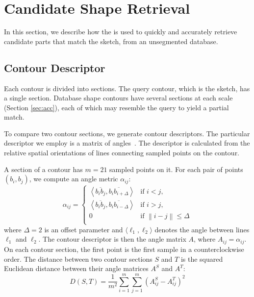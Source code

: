 
\section{Candidate Shape Retrieval}\label{sec:candshape}
In this section, we describe how the {\RCKNNG} is used to quickly and accurately retrieve candidate parts that match the sketch, from an unsegmented database.

\subsection{Contour Descriptor}\label{subsec:CtourDesc}
Each contour is divided into sections. The query contour, which is the sketch, has a single section. Database shape contours have several sections at each scale (Section \ref{sec:acc}), each of which may resemble the query to yield a partial match.

To compare two contour sections, we generate contour descriptors. The particular descriptor we employ is a matrix of angles~\cite{partialedgecontourriemeneccv2010}. The descriptor is calculated from the relative spatial orientations of lines connecting sampled points on the contour.

A section of a contour has $m = 21$ sampled points on it. For each pair of points $(b_i, b_j)$, we compute an angle metric $\alpha_{ij}$:
\[{\alpha _{ij}} = \left\{ {\begin{array}{*{20}{c}}
   {\left\langle {\overline {{b_i}{b_j}} ,\overline {{b_i}{b_{i + \Delta }}} } \right\rangle } & {\text{if~} i < j,}  \\
   {\left\langle {\overline {{b_i}{b_j}} ,\overline {{b_i}{b_{i - \Delta }}} } \right\rangle } & {\text{if~} i > j,}  \\
   0 & {\text{if~} \left\| {i - j} \right\| \le \Delta }  \\
\end{array}} \right.\]
where $\Delta = 2$ is an offset parameter and $\langle \ell_1, \ell_2 \rangle$ denotes the angle between lines $\ell_1$ and $\ell_2$. The contour descriptor is then the angle matrix $A$, where $A_{ij} = \alpha_{ij}$. On each contour section, the first point is the first sample in a counterclockwise order.
The distance between two contour sections $S$ and $T$ is the squared Euclidean distance between their angle matrices $A^S$ and $A^T$:
\[
D(S, T) = \frac{1}{m^2} \sum_{i = 1}^m \sum_{j = 1}^m \left( A^S_{ij} - A^T_{ij} \right)^2
\]

